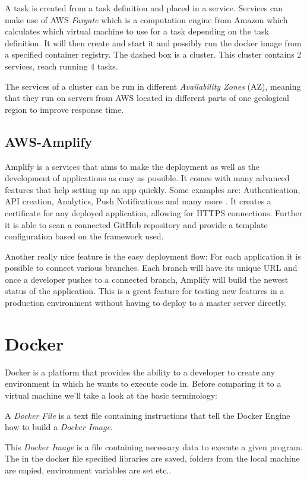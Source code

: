 A task is created from a task definition and placed in a service. Services can make use of AWS \emph{Fargate} which is a computation engine from Amazon which calculates which virtual machine to use for a task depending on the task definition. It will then create and start it and possibly run the docker image from a specified container registry. \cite{AwsFargate} The dashed box is a cluster. This cluster contains 2 services, reach running 4 tasks. 

The services of a cluster can be run in different \emph{Availability Zones} (AZ), meaning that they run on servers from AWS located in different parts of one geological region to improve response time.

\subsection{AWS-Amplify}
Amplify is a services that aims to make the deployment as well as the development of applications as easy as possible. It comes with many advanced features that help setting up an app quickly. Some examples are: Authentication, API creation, Analytics, Push Notifications and many more \cite{AwsAmplify}. It creates a certificate for any deployed application, allowing for HTTPS connections. Further it is able to scan a connected GitHub repository and provide a template configuration based on the framework used.

Another really nice feature is the easy deployment flow: For each application it is possible to connect various branches. Each branch will have its unique URL and once a developer pushes to a connected branch, Amplify will build the newest status of the application. This is a great feature for testing new features in a production environment without having to deploy to a master server directly.

\section{Docker}
Docker is a platform that provides the ability to a developer to create any environment in which he wants to execute code in.
Before comparing it to a virtual machine we'll take a look at the basic terminology:

A \emph{Docker File} is a text file containing instructions that tell the Docker Engine how to build a \emph{Docker Image}. \cite{NickDocker}

This \emph{Docker Image} is a file containing necessary data to execute a given program. The in the docker file specified libraries are saved, folders from the local machine are copied, environment variables are set etc.. 

